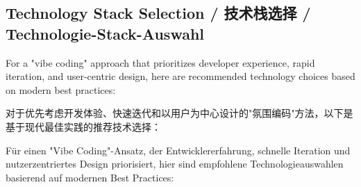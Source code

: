 \subsection{Technology Stack Selection / 技术栈选择 / Technologie-Stack-Auswahl}

For a "vibe coding" approach that prioritizes developer experience, rapid iteration, and user-centric design, here are recommended technology choices based on modern best practices:

对于优先考虑开发体验、快速迭代和以用户为中心设计的"氛围编码"方法，以下是基于现代最佳实践的推荐技术选择：

Für einen "Vibe Coding"-Ansatz, der Entwicklererfahrung, schnelle Iteration und nutzerzentriertes Design priorisiert, hier sind empfohlene Technologieauswahlen basierend auf modernen Best Practices:

